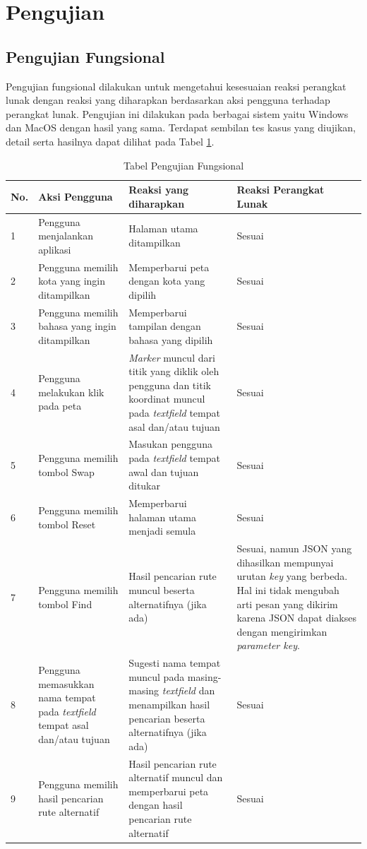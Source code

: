 \section{Pengujian}
\subsection{Pengujian Fungsional}

Pengujian fungsional dilakukan untuk mengetahui kesesuaian reaksi perangkat lunak dengan reaksi yang diharapkan berdasarkan aksi pengguna terhadap perangkat lunak. Pengujian ini dilakukan pada berbagai sistem yaitu Windows dan MacOS dengan hasil yang sama. Terdapat sembilan tes kasus yang diujikan, detail serta hasilnya dapat dilihat pada Tabel \ref{table:hasilFungsional}.
			
\begin{table}[H]
	\centering
	\caption{Tabel Pengujian Fungsional}
		\begin{tabular}{|p{0.25cm}| p{3.5cm}| p{7cm}| p{2.5cm}|} \hline
		No.	&	Aksi Pengguna	&	Reaksi yang diharapkan	&	Reaksi Perangkat Lunak \\ \hline
		1 & Pengguna menjalankan aplikasi & Halaman utama ditampilkan & Sesuai \\ \hline
2 & Pengguna memilih kota yang ingin ditampilkan & Memperbarui peta dengan kota yang dipilih & Sesuai \\ \hline
3 & Pengguna memilih bahasa yang ingin ditampilkan & Memperbarui tampilan dengan bahasa yang dipilih & Sesuai \\ \hline
4 & Pengguna melakukan klik pada peta & \textit{Marker} muncul dari titik yang diklik oleh pengguna dan titik koordinat muncul pada \textit{textfield} tempat asal dan/atau tujuan & Sesuai \\ \hline
5 & Pengguna memilih tombol Swap & Masukan pengguna pada \textit{textfield} tempat awal dan tujuan ditukar & Sesuai \\ \hline
6 & Pengguna memilih tombol Reset & Memperbarui halaman utama menjadi semula & Sesuai \\ \hline
7 & Pengguna memilih tombol Find & Hasil pencarian rute muncul beserta alternatifnya (jika ada) & Sesuai, namun JSON yang dihasilkan mempunyai urutan \textit{key} yang berbeda. Hal ini tidak mengubah arti pesan yang dikirim karena JSON dapat diakses dengan mengirimkan \textit{parameter key}. \\ \hline
8 & Pengguna memasukkan nama tempat pada \textit{textfield} tempat asal dan/atau tujuan & Sugesti nama tempat muncul pada masing-masing \textit{textfield} dan menampilkan hasil pencarian beserta alternatifnya (jika ada) & Sesuai \\ \hline
9 & Pengguna memilih hasil pencarian rute alternatif & Hasil pencarian rute alternatif muncul dan memperbarui peta dengan hasil pencarian rute alternatif & Sesuai \\ \hline
		
		\end{tabular}
	\label{table:hasilFungsional}
\end{table}


